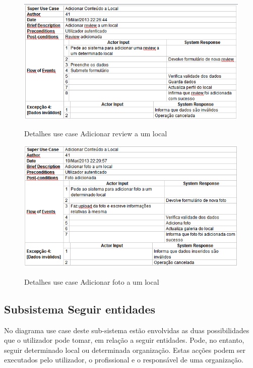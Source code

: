 ﻿\documentclass[12pt,a4paper]{article}
\begin{document}
\begin{figure}[h!]
\centering
\includegraphics[scale=0.7]{d_usecase/adicionarreview}
\label{usecase}
\caption{Detalhes use case Adicionar review a um local}
\end{figure}

\begin{figure}[h!]
\centering
\includegraphics[scale=0.7]{d_usecase/adicionarfoto}
\label{usecase}
\caption{Detalhes use case Adicionar foto a um local}
\end{figure}

\clearpage
\subsection{Subsistema Seguir entidades}
No diagrama use case deste sub-sistema estão envolvidas as duas possibilidades que o utilizador pode tomar, em relação a seguir entidades. Pode, no entanto, seguir determinado local ou determinada organização. Estas acções podem ser executados pelo utilizador, o profissional e o responsável de uma organização.\\
\end{document}
